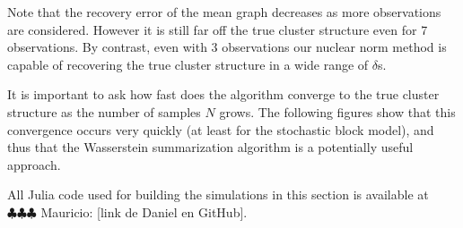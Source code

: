 \documentclass[12pt]{amsart}
\theoremstyle{remark}
\newcommand{\mv}[1]{{\color{red} \sf $\clubsuit\clubsuit\clubsuit$ Mauricio: [#1]}}
\begin{document}
Note that the recovery error of the mean graph decreases as more observations are considered. However it is still far off the true cluster structure even for 7 observations. By contrast, even with 3 observations our nuclear norm method is capable of recovering the true cluster structure in a wide range of $\delta$s. 
  
It is important to ask how fast does  the algorithm converge to the true cluster structure as the number of samples $N$ grows. The following figures show that this convergence occurs very quickly (at least for the stochastic block model), and thus that the Wasserstein summarization algorithm is a potentially useful approach.

All Julia code used for building the simulations in this section is available at \mv{link de Daniel en GitHub}.
\end{document}
